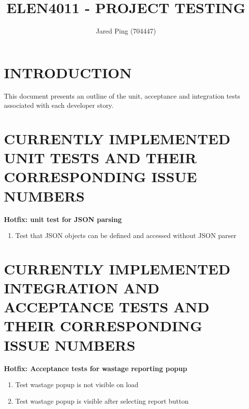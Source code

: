 \documentclass[10pt,onecolumn]{witseiepaper}
\title{ELEN4011 - PROJECT TESTING}
\author{Jared Ping (704447)}
\begin{document}
\maketitle
\pagestyle{plain}
\setcounter{page}{1}

\section*{INTRODUCTION}
This document presents an outline of the unit, acceptance and integration tests associated with each developer story.


\section*{CURRENTLY IMPLEMENTED UNIT TESTS AND THEIR CORRESPONDING ISSUE NUMBERS}

\textbf{Hotfix: unit test for JSON parsing}

\begin{enumerate}
	\item Test that JSON objects can be defined and accessed without JSON parser
\end{enumerate}

\vspace{5mm}
\section*{CURRENTLY IMPLEMENTED INTEGRATION AND ACCEPTANCE TESTS AND THEIR CORRESPONDING ISSUE NUMBERS}

\textbf{Hotfix: Acceptance tests for wastage reporting popup}

\begin{enumerate}
	\item Test wastage popup is not visible on load
	\item Test wastage popup is visible after selecting report button
\end{enumerate}
\end{document}
